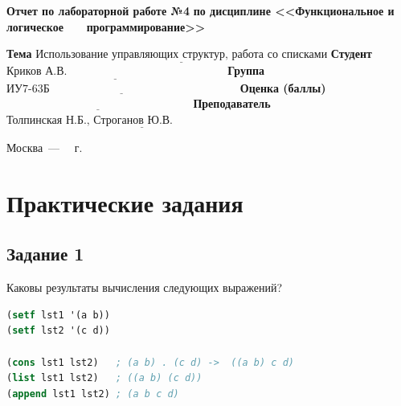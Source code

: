 \documentclass[12pt]{report}
\begin{document}
\begin{titlepage}
		\begin{center}
			\noindent\begin{minipage}{1.1\textwidth}\centering
				\Large\textbf{  Отчет по лабораторной работе №4}\newline
				\textbf{по дисциплине <<Функциональное и логическое}\newline
				\textbf{~~~программирование>>}\newline\newline
			\end{minipage}
		\end{center}
		
		\noindent\textbf{Тема} $\underline{\text{Использование управляющих структур, работа со списками}}$\newline\newline
		\noindent\textbf{Студент} $\underline{\text{Криков А.В.~~~~~~~~~~~~~~~~~~~~~~~~~~~~~~~~~~~~~~~~~~}}$\newline\newline
		\noindent\textbf{Группа} $\underline{\text{ИУ7-63Б~~~~~~~~~~~~~~~~~~~~~~~~~~~~~~~~~~~~~~~~~~~~~~~~~~}}$\newline\newline
		\noindent\textbf{Оценка (баллы)} $\underline{\text{~~~~~~~~~~~~~~~~~~~~~~~~~~~~~~~~~~~~~~~~~~~~~~~~~}}$\newline\newline
		\noindent\textbf{Преподаватель} $\underline{\text{Толпинская Н.Б., Строганов Ю.В.~~~~~~~~~~~~~~~~~~~~~~~~~~~~}}$\newline\newline\newline
		
		\begin{center}
			\vfill
			Москва~---~\the\year
			~г.
		\end{center}
	\end{titlepage}
	
	


\chapter*{Практические задания}

\section*{Задание 1}
Каковы результаты вычисления следующих выражений?

\begin{lstlisting}[label=9, language=lisp]
(setf lst1 '(a b))
(setf lst2 '(c d))

(cons lst1 lst2)   ; (a b) . (c d) ->  ((a b) c d)
(list lst1 lst2)   ; ((a b) (c d))
(append lst1 lst2) ; (a b c d)

\end{lstlisting}
	
\end{document}
